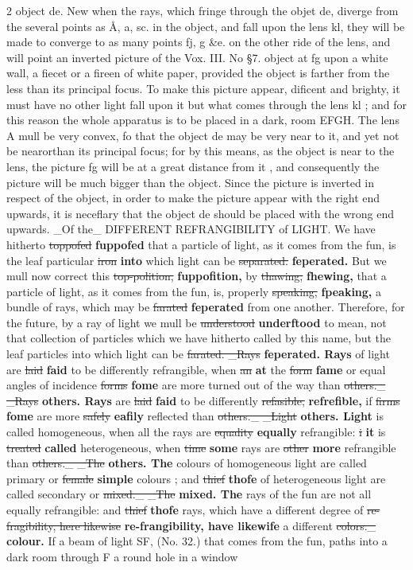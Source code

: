 \documentclass[10pt]{article}
\begin{document}
\begin{multicols}{2}
object de. New when the rays, which fringe through the objet de, diverge from the several points as Å, a, sc. in the object, and fall upon the lens kl, they will be made to converge to as many points fj, g \&e. on the other ride of the lens, and will point an inverted picture of the Vox. III. No §7. object at fg upon a white wall, a fiecet or a fireen of white paper, provided the object is farther from the less than its principal focus. To make this picture appear, dificent and brighty, it must have no other light fall upon it but what comes through the lens kl ; and for this reason the whole apparatus is to be placed in a dark, room EFGH. The lens A mull be very convex, fo that the object de may be very near to it, and yet not be nearorthan its principal focus; for by this means, as the object is near to the lens, the picture fg will be at a great distance from it , and consequently the picture will be much bigger than the object. Since the picture is inverted in respect of the object, in order to make the picture appear with the right end upwards, it is neceflary that the object de should be placed with the wrong end upwards. \_Of the\_ DIFFERENT REFRANGIBILITY of LIGHT. We have hitherto \sout{toppofed} \textbf{fuppofed} that a particle of light, as it comes from the fun, is the leaf particular \sout{iron} \textbf{into} which light can be \sout{separated.} \textbf{feperated.} But we mull now correct this \sout{top-polition,} \textbf{fuppofition,} by \sout{thawing,} \textbf{fhewing,} that a particle of light, as it comes from the fun, is, properly \sout{speaking,} \textbf{fpeaking,} a bundle of rays, which may be \sout{farated} \textbf{feperated} from one another. Therefore, for the future, by a ray of light we mull be \sout{understood} \textbf{underftood} to mean, not that collection of particles which we have hitherto called by this name, but the leaf particles into which light can be \sout{farated. \_Rays} \textbf{feperated. Rays} of light are \sout{laid} \textbf{faid} to be differently refrangible, when \sout{an} \textbf{at} the \sout{form} \textbf{fame} or equal angles of incidence \sout{forms} \textbf{fome} are more turned out of the way than \sout{others.\_ \_Rays} \textbf{others. Rays} are \sout{laid} \textbf{faid} to be differently \sout{refasible,} \textbf{refrefible,} if \sout{firms} \textbf{fome} are more \sout{safely} \textbf{eafily} reflected than \sout{others.\_ \_Light} \textbf{others. Light} is called homogeneous, when all the rays are \sout{equality} \textbf{equally} refrangible: \sout{i} \textbf{it} is \sout{treated} \textbf{called} heterogeneous, when \sout{time} \textbf{some} rays are \sout{other} \textbf{more} refrangible than \sout{others.\_ \_The} \textbf{others. The} colours of homogeneous light are called primary or \sout{female} \textbf{simple} colours ; and \sout{thief} \textbf{thofe} of heterogeneous light are called secondary or \sout{mixed.\_ \_The} \textbf{mixed. The} rays of the fun are not all equally refrangible: and \sout{thief} \textbf{thofe} rays, which have a different degree of \sout{re-fragibility, here likewise} \textbf{re-frangibility, have likewife} a different \sout{colors.\_} \textbf{colour.} If a beam of light SF, (No. 32.) that comes from the fun, paths into a dark room through F a round hole in a window 
\end{multicols}
\end{document}
